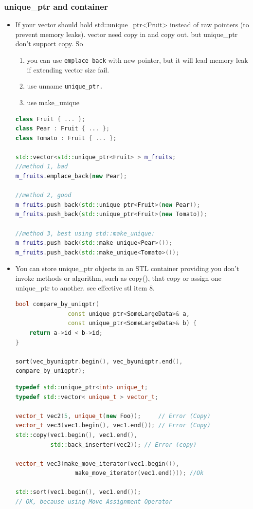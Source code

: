 \documentclass[a4paper,11pt,twoside]{book}
\begin{document}
\subsubsection{unique\_ptr and container}
\begin{itemize}

\item If your vector should hold std::unique\_ptr<Fruit> instead of raw pointers (to prevent memory leaks). vector need copy in and copy out. but unique\_ptr don't support copy. So 
\begin{enumerate}
	\item you can use \texttt{emplace\_back} with new pointer, but it will lead memory leak if extending vector size fail.
	\item use unname \texttt{unique\_ptr.}
	\item use make\_unique
\end{enumerate}
\begin{lstlisting}[frame=single, language=c++]
class Fruit { ... };
class Pear : Fruit { ... };
class Tomato : Fruit { ... };

std::vector<std::unique_ptr<Fruit> > m_fruits;
//method 1, bad
m_fruits.emplace_back(new Pear);

//method 2, good
m_fruits.push_back(std::unique_ptr<Fruit>(new Pear));
m_fruits.push_back(std::unique_ptr<Fruit>(new Tomato));

//method 3, best using std::make_unique:
m_fruits.push_back(std::make_unique<Pear>());
m_fruits.push_back(std::make_unique<Tomato>());
\end{lstlisting}

\item You can store unique\_ptr objects in an STL container providing you don't invoke methods or algorithm, such as copy(), that copy or assign one unique\_ptr to another.  see effective stl item 8.

\begin{lstlisting}[frame=single, language=c++]
bool compare_by_uniqptr(
               const unique_ptr<SomeLargeData>& a,
               const unique_ptr<SomeLargeData>& b) {
    return a->id < b->id;
}

sort(vec_byuniqptr.begin(), vec_byuniqptr.end(),
compare_by_uniqptr);
\end{lstlisting}


\begin{lstlisting}[frame=single, language=c++]
typedef std::unique_ptr<int> unique_t;
typedef std::vector< unique_t > vector_t;

vector_t vec2(5, unique_t(new Foo));     // Error (Copy)
vector_t vec3(vec1.begin(), vec1.end()); // Error (Copy)
std::copy(vec1.begin(), vec1.end(),
          std::back_inserter(vec2)); // Error (copy)

vector_t vec3(make_move_iterator(vec1.begin()),
                 make_move_iterator(vec1.end())); //Ok

std::sort(vec1.begin(), vec1.end());
// OK, because using Move Assignment Operator
\end{lstlisting}

\end{itemize}
\end{document}
